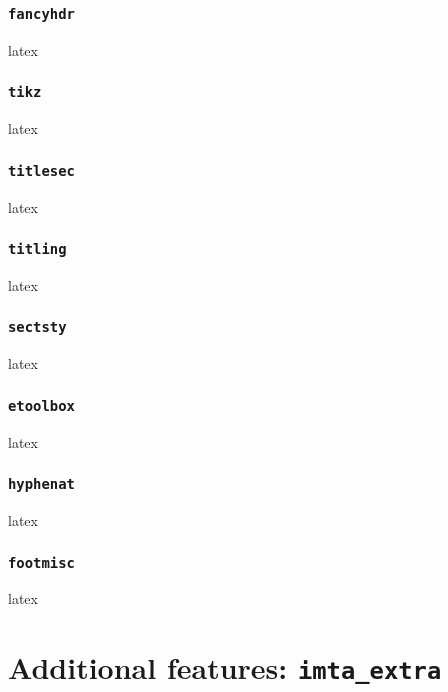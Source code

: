 \documentclass{report}
\begin{document}
\subsection{\texttt{fancyhdr}}
\begin{imtaCode}{latex}
\RequirePackage{fancyhdr}
\end{imtaCode}

\subsection{\texttt{tikz}}
\begin{imtaCode}{latex}
\RequirePackage{tikz}
\end{imtaCode}

\subsection{\texttt{titlesec}}
\begin{imtaCode}{latex}
\RequirePackage{titlesec}
\end{imtaCode}

\subsection{\texttt{titling}}
\begin{imtaCode}{latex}
\RequirePackage{titling}
\end{imtaCode}

\subsection{\texttt{sectsty}}
\begin{imtaCode}{latex}
\RequirePackage{sectsty}
\end{imtaCode}

\subsection{\texttt{etoolbox}}
\begin{imtaCode}{latex}
\RequirePackage{etoolbox}
\end{imtaCode}

\subsection{\texttt{hyphenat}}
\begin{imtaCode}{latex}
\RequirePackage[none]{hyphenat}
\end{imtaCode}

\subsection{\texttt{footmisc}}
\begin{imtaCode}{latex}
\RequirePackage[bottom]{footmisc}
\end{imtaCode}

\chapter{Additional features: \texttt{imta_extra}}
\end{document}
